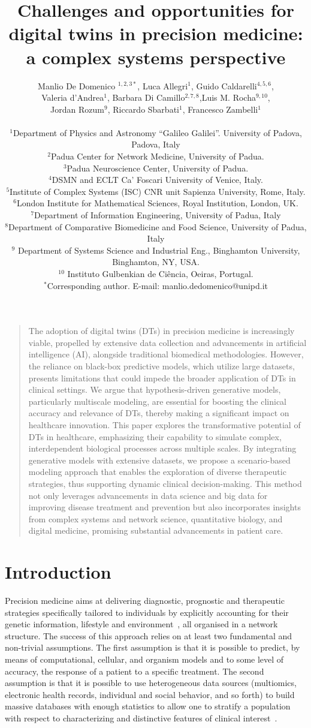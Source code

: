 \documentclass[12pt]{article}
\title{Challenges and opportunities for digital twins in precision medicine: a complex systems perspective}
\author
{Manlio De Domenico $^{1,2,3\ast}$, Luca Allegri$^{1}$, Guido Caldarelli$^{4,5,6}$, \\
Valeria d'Andrea$^{1}$, Barbara Di Camillo$^{2,7,8}$,Luis M. Rocha$^{9,10}$,\\
Jordan Rozum$^{9}$, Riccardo Sbarbati$^{1}$, Francesco Zambelli$^{1}$\\
\\
\normalsize{$^{1}$Department of Physics and Astronomy ``Galileo Galilei''.} 
\normalsize{University of Padova, Padova, Italy}\\
\normalsize{$^{2}$Padua Center for Network Medicine, University of Padua.}\\
\normalsize{$^{3}$Padua Neuroscience Center, University of Padua.}\\ 
\normalsize{$^{4}$DSMN and ECLT Ca' Foscari University of Venice, Italy.}\\
\normalsize{$^{5}$Institute of Complex Systems (ISC) CNR unit Sapienza University, Rome, Italy.}\\
\normalsize{$^{6}$London Institute for Mathematical Sciences, Royal Institution, London, UK.}\\
\normalsize{$^{7}$Department of Information Engineering, University of Padua, Italy}\\
\normalsize{$^{8}$Department of Comparative Biomedicine and Food Science, University of Padua, Italy}\\
\normalsize $^{9}$ Department of Systems Science and Industrial Eng., Binghamton University, Binghamton, NY, USA. \\
\normalsize $^{10}$ Instituto Gulbenkian de Ciência, Oeiras, Portugal. \\
\normalsize{$^\ast$Corresponding author. E-mail: manlio.dedomenico@unipd.it}
}
\date{}
\newenvironment{sciabstract}{%
\begin{quote} \bf}
{\end{quote}}
\renewcommand{\(}{\left(}
\renewcommand{\)}{\right)}
\renewcommand{\[}{\left[}
\renewcommand{\]}{\right]}
\begin{document}
 


\baselineskip24pt

\maketitle 



\begin{sciabstract} 

The adoption of digital twins (DTs) in precision medicine is increasingly viable, propelled by extensive data collection and advancements in artificial intelligence (AI), alongside traditional biomedical methodologies. However, the reliance on black-box predictive models, which utilize large datasets, presents limitations that could impede the broader application of DTs in clinical settings. We argue that hypothesis-driven generative models, particularly multiscale modeling, are essential for boosting the clinical accuracy and relevance of DTs, thereby making a significant impact on healthcare innovation. This paper explores the transformative potential of DTs in healthcare, emphasizing their capability to simulate complex, interdependent biological processes across multiple scales. By integrating generative models with extensive datasets, we propose a scenario-based modeling approach that enables the exploration of diverse therapeutic strategies, thus supporting dynamic clinical decision-making. This method not only leverages advancements in data science and big data for improving disease treatment and prevention but also incorporates insights from complex systems and network science, quantitative biology, and digital medicine, promising substantial advancements in patient care.
\end{sciabstract}




\section*{Introduction}

Precision medicine aims at delivering diagnostic, prognostic and therapeutic strategies specifically tailored to individuals by explicitly accounting for their genetic information, lifestyle and environment~\cite{mirnezami2012preparing}, all organised in a network structure\cite{barabasi2011network}. The success of this approach relies on at least two fundamental and non-trivial assumptions. The first assumption is that it is possible to predict, by means of computational, cellular, and organism models and to some level of accuracy, the response of a patient to a specific treatment. The second assumption is that it is possible to use heterogeneous data sources (multiomics, electronic health records, individual and social behavior, %
and so forth) to build massive databases with enough statistics to allow one to stratify a population with respect to characterizing and distinctive features of clinical interest~\cite{konig2017precision}.
\end{document}
